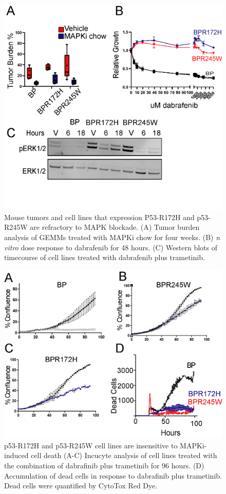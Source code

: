 \begin{figure}
\hypertarget{fig:3.7}{%
\centering
\includegraphics[width=1\textwidth,height=\textheight]{images/p536.png}
\caption{Mouse tumors and cell lines that expression P53-R172H and p53-R245W are refractory to MAPK blockade. (A) Tumor burden analysis of GEMMs treated with MAPKi chow for four weeks. (B) \emph{n vitro} dose response to dabrafenib for 48 hours. (C) Western blots of timecourse of cell lines treated with dabrafenib plus trametinib.}\label{fig:3.7}
}
\end{figure}

\begin{figure}
\hypertarget{fig:3.8}{%
\centering
\includegraphics[width=1\textwidth,height=\textheight]{images/p537.png}
\caption{p53-R172H and p53-R245W cell lines are insensitive to MAPKi-induced cell death (A-C) Incucyte analysis of cell lines treated with the combination of dabrafinib plus trametinib for 96 hours. (D) Accumulation of dead cells in response to dabrafinib plus trametinib. Dead cells were quantified by CytoTox Red Dye.}\label{fig:3.8}
}
\end{figure}

